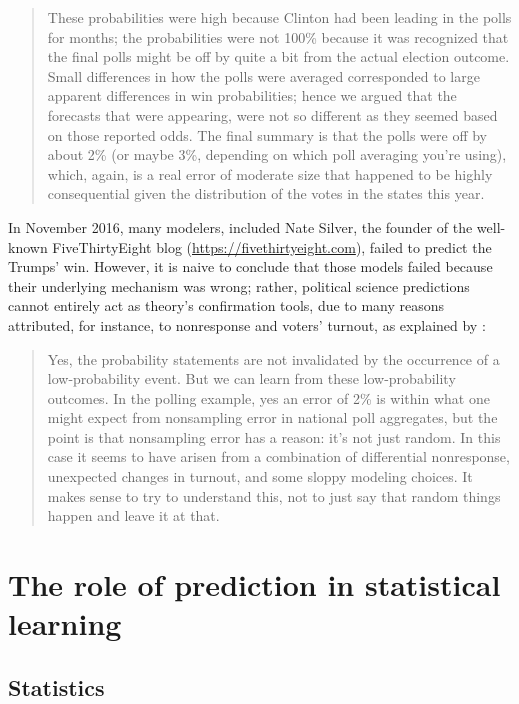 \documentclass{statsoc}
\begin{document}
\begin{quote}
 These probabilities were high because Clinton had been leading in the polls for months; the probabilities were not 100\% because it was recognized that the final polls might be off by quite a bit from the actual election outcome. Small differences in how the polls were averaged corresponded to large apparent differences in win probabilities; hence we argued that the forecasts that were appearing, were not so different as they seemed based on those reported odds. The final summary is that the polls were off by about 2\% (or maybe 3\%, depending on which poll averaging you’re using), which, again, is a real error of moderate size that happened to be highly consequential given the distribution of the votes in the states this year.
\end{quote}
%
In November 2016, many modelers, included Nate Silver, the founder of the well-known FiveThirtyEight blog (\url{https://fivethirtyeight.com}), failed to predict the Trumps' win. However, it is naive to conclude that those models failed because their underlying mechanism was wrong; rather, political science predictions cannot  entirely act as theory's confirmation tools, due to many reasons attributed, for instance, to nonresponse and voters' turnout, as explained by \cite{gelman2016elections2}:

\begin{quote}
Yes, the probability statements are not invalidated by the occurrence of a low-probability event. But we can learn from these low-probability outcomes. In the polling example, yes an error of 2\% is within what one might expect from nonsampling error in national poll aggregates, but the point is that nonsampling error has a reason: it’s not just random. In this case it seems to have arisen from a combination of differential nonresponse, unexpected changes in turnout, and some sloppy modeling choices. It makes sense to try to understand this, not to just say that random things happen and leave it at that.
\end{quote}

\section{The role of prediction in statistical learning}
\label{sec:role}

\subsection{Statistics}
\end{document}
